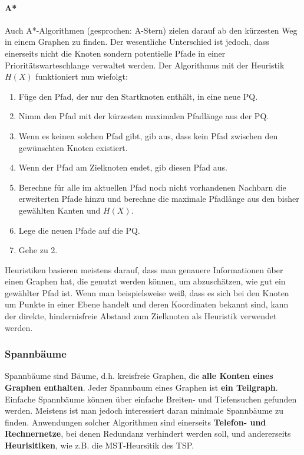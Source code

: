 \documentclass{article}
\begin{document}
\paragraph{A*}
Auch A*-Algorithmen (gesprochen: A-Stern) zielen darauf ab den kürzesten Weg in einem Graphen zu finden. Der wesentliche Unterschied ist jedoch, dass einerseits nicht die Knoten sondern potentielle Pfade in einer Prioritätswarteschlange verwaltet werden.
Der Algorithmus mit der Heuristik $H(X)$ funktioniert nun wiefolgt:
\begin{enumerate}
    \item Füge den Pfad, der nur den Startknoten enthält, in eine neue PQ.
    \item Nimm den Pfad mit der kürzesten maximalen Pfadlänge aus der PQ.
    \item Wenn es keinen solchen Pfad gibt, gib aus, dass kein Pfad zwischen den gewünschten Knoten existiert.
    \item Wenn der Pfad am Zielknoten endet, gib diesen Pfad aus.
    \item Berechne für alle im aktuellen Pfad noch nicht vorhandenen Nachbarn die erweiterten Pfade hinzu und berechne die maximale Pfadlänge aus den bisher gewählten Kanten und $H(X)$.
    \item Lege die neuen Pfade auf die PQ.
    \item Gehe zu 2.
\end{enumerate}
Heuristiken basieren meistens darauf, dass man genauere Informationen über einen Graphen hat, die genutzt werden können, um abzuschätzen, wie gut ein gewählter Pfad ist. Wenn man beispielsweise weiß, dass es sich bei den Knoten um Punkte in einer Ebene handelt und deren Koordinaten bekannt sind, kann der direkte, hindernisfreie Abstand zum Zielknoten als Heuristik verwendet werden.
\subsubsection{Spannbäume}
Spannbäume sind Bäume, d.h. kreisfreie Graphen, die \textbf{alle Konten eines Graphen enthalten}. Jeder Spannbaum eines Graphen ist \textbf{ein Teilgraph}.\\
Einfache Spannbäume können über einfache Breiten- und Tiefensuchen gefunden werden. Meistens ist man jedoch interessiert daran minimale Spannbäume zu finden. Anwendungen solcher Algorithmen sind einerseits \textbf{Telefon- und Rechnernetze}, bei denen Redundanz verhindert werden soll, und andererseits \textbf{Heurisitiken}, wie z.B. die MST-Heursitik des TSP.
\end{document}
